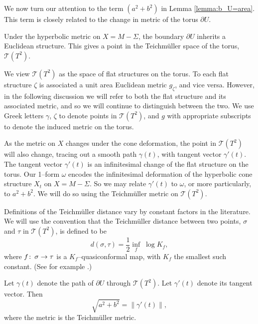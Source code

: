 We now turn our attention to the term $(a^2+b^2)$ in Lemma
\ref{lemma:b_U=area}.  This term is closely related to the change
in metric of the torus $\partial U$.

Under the hyperbolic metric on $X=M-\Sigma$, the boundary $\partial U$
inherits a Euclidean structure.  This gives a point in the
Teichm\"uller space of the torus, $\mathcal{T}(T^2)$.  

\begin{remark}
We view $\mathcal{T}(T^2)$ as the space of flat structures on the
torus.  To each flat structure $\zeta$ is associated a unit area
Euclidean metric $g_{\zeta}$, and vice versa.  However, in the
following discussion we will refer to both the flat structure and its
associated metric, and so we will continue to distinguish between the
two.  We use Greek letters $\gamma$, $\zeta$ to denote points in
$\mathcal{T}(T^2)$, and $g$ with appropriate subscripts to denote the
induced metric on the torus.
\end{remark}

As the metric on $X$ changes under the cone deformation, the point in
$\mathcal{T}(T^2)$ will also change, tracing out a smooth path
$\gamma(t)$, with tangent vector $\gamma'(t)$.  The tangent vector
$\gamma'(t)$ is an infinitesimal change of the flat structure on the
torus.  Our 1--form $\omega$ encodes the infinitesimal deformation of
the hyperbolic cone structure $X_t$ on $X=M-\Sigma$.  So we may relate
$\gamma'(t)$ to $\omega$, or more particularly, to $a^2+b^2$.  We will
do so using the Teichm\"uller metric on $\mathcal{T}(T^2)$.

Definitions of the Teichm\"uller distance vary by constant factors in
the literature.  We will use the convention that the Teichm\"uller
distance between two points, $\sigma$ and $\tau$ in
$\mathcal{T}(T^2)$, is defined to be
$$d(\sigma, \tau) = \frac{1}{2}\inf_{f}\;\log K_f,$$ where $f\colon\thinspace
\sigma \to \tau$ is a $K_f$--quasiconformal map, with $K_f$ the
smallest such constant.  (See for example \cite{lehto}.)


\begin{lemma}
  Let $\gamma(t)$ denote the path of $\partial U$ through
  $\mathcal{T}(T^2)$.  Let $\gamma'(t)$ denote its tangent vector.
  Then
  $$\sqrt{a^2+b^2} = \left\| \gamma'(t) \right\|,$$
  where the metric is the {T}eichm{\"u}ller metric.
\label{lemma:a+b-gamma}
\end{lemma}

